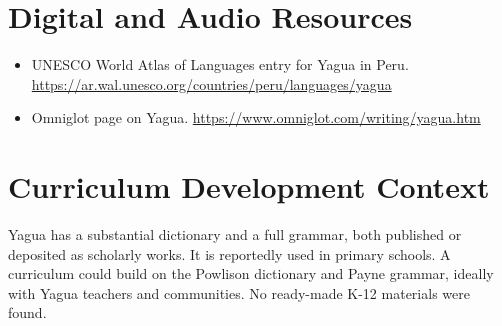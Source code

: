 \documentclass[12pt]{article}
\begin{document}
\section{Digital and Audio Resources}
\begin{itemize}
\item UNESCO World Atlas of Languages entry for Yagua in Peru. \url{https://ar.wal.unesco.org/countries/peru/languages/yagua}
\item Omniglot page on Yagua. \url{https://www.omniglot.com/writing/yagua.htm}
\end{itemize}

\section{Curriculum Development Context}
Yagua has a substantial dictionary and a full grammar, both published or deposited as scholarly works. It is reportedly used in primary schools. A curriculum could build on the Powlison dictionary and Payne grammar, ideally with Yagua teachers and communities. No ready-made K-12 materials were found.
\end{document}
